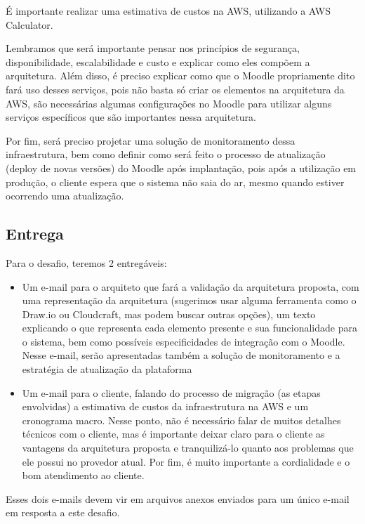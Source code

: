 \documentclass{article}
\begin{document}
É importante realizar uma estimativa de custos na AWS, utilizando a AWS Calculator.

Lembramos que será importante pensar nos princípios de segurança, disponibilidade, escalabilidade e custo e explicar como eles compõem a arquitetura. Além disso, é preciso explicar como que o Moodle propriamente dito fará uso desses serviços, pois não basta só criar os elementos na arquitetura da AWS, são necessárias algumas configurações no Moodle para utilizar alguns serviços específicos que são importantes nessa arquitetura.

Por fim, será preciso projetar uma solução de monitoramento dessa infraestrutura, bem como definir como será feito o processo de atualização (deploy de novas versões) do Moodle após implantação, pois após a utilização em produção, o cliente espera que o sistema não saia do ar, mesmo quando estiver ocorrendo uma atualização.

\subsection{Entrega}
Para o desafio, teremos 2 entregáveis:
\begin{itemize}
    \item Um e-mail para o arquiteto que fará a validação da arquitetura proposta, com uma representação da arquitetura (sugerimos usar alguma ferramenta como o Draw.io ou Cloudcraft, mas podem buscar outras opções), um texto explicando o que representa cada elemento presente e sua funcionalidade para o sistema, bem como possíveis especificidades de integração com o Moodle. Nesse e-mail, serão apresentadas também a solução de monitoramento e a estratégia de atualização da plataforma
    \item Um e-mail para o cliente, falando do processo de migração (as etapas envolvidas) a estimativa de custos da infraestrutura na AWS e um cronograma macro. Nesse ponto, não é necessário falar de muitos detalhes técnicos com o cliente, mas é importante deixar claro para o cliente as vantagens da arquitetura proposta e tranquilizá-lo quanto aos problemas que ele possui no provedor atual. Por fim, é muito importante a cordialidade e o bom atendimento ao cliente.
\end{itemize}

Esses dois e-mails devem vir em arquivos anexos enviados para um único e-mail em resposta a este desafio.
\end{document}
